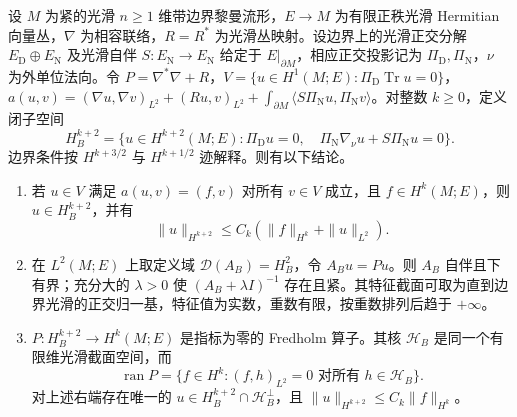 \begin{theorem}\label{g3:thm:mixed-bundle-fredholm}
	设 \(M\) 为紧的光滑 \(n\ge1\) 维带边界黎曼流形，\(E\to M\) 为有限正秩光滑 Hermitian 向量丛，\(\nabla\) 为相容联络，\(R=R^*\) 为光滑丛映射。设边界上的光滑正交分解 \(E_{\mathrm D}\oplus E_{\mathrm N}\) 及光滑自伴 \(S:E_{\mathrm N}\to E_{\mathrm N}\) 给定于 \(E|_{\partial M}\)，相应正交投影记为 \(\Pi_{\mathrm D},\Pi_{\mathrm N}\)，\(\nu\) 为外单位法向。令 \(P=\nabla^*\nabla+R\)，\(V=\{u\in H^1(M;E):\Pi_{\mathrm D}\operatorname{Tr}u=0\}\)，\(a(u,v)=(\nabla u,\nabla v)_{L^2}+(Ru,v)_{L^2}+\int_{\partial M}\langle S\Pi_{\mathrm N}u,\Pi_{\mathrm N}v\rangle\)。对整数 \(k\ge0\)，定义闭子空间
	\[
		H_B^{k+2}=
		\{u\in H^{k+2}(M;E):
		\Pi_{\mathrm D}u=0,\quad
		\Pi_{\mathrm N}\nabla_\nu u+S\Pi_{\mathrm N}u=0\}.
	\]
	边界条件按 \(H^{k+3/2}\) 与 \(H^{k+1/2}\) 迹解释。则有以下结论。
	\begin{enumerate}
		\item 若 \(u\in V\) 满足 \(a(u,v)=(f,v)\) 对所有 \(v\in V\) 成立，且 \(f\in H^k(M;E)\)，则 \(u\in H_B^{k+2}\)，并有
		\begin{equation}\label{g3:eq:mixed-bundle-global-estimate}
			\|u\|_{H^{k+2}}
			\le C_k(\|f\|_{H^k}+\|u\|_{L^2}).
		\end{equation}
		\item 在 \(L^2(M;E)\) 上取定义域 \(\mathcal D(A_B)=H_B^2\)，令 \(A_Bu=Pu\)。则 \(A_B\) 自伴且下有界；充分大的 \(\lambda>0\) 使 \((A_B+\lambda I)^{-1}\) 存在且紧。其特征截面可取为直到边界光滑的正交归一基，特征值为实数，重数有限，按重数排列后趋于 \(+\infty\)。
		\item \(P:H_B^{k+2}\to H^k(M;E)\) 是指标为零的 Fredholm 算子。其核 \(\mathcal H_B\) 是同一个有限维光滑截面空间，而
		\begin{equation}\label{g3:eq:mixed-bundle-fredholm-range}
			\operatorname{ran}P
			=\{f\in H^k:(f,h)_{L^2}=0\text{ 对所有 }h\in\mathcal H_B\}.
		\end{equation}
		对上述右端存在唯一的 \(u\in H_B^{k+2}\cap\mathcal H_B^\perp\)，且
		\(\|u\|_{H^{k+2}}\le C_k\|f\|_{H^k}\)。
	\end{enumerate}
\end{theorem}
